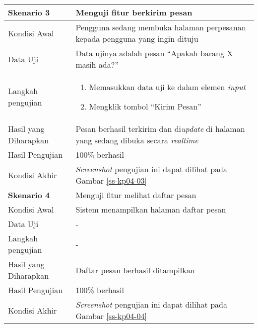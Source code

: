 \begin{longtable}{|X|X|}
		
	\textbf{Skenario 3}
		& Menguji fitur berkirim pesan \\ \hline
	Kondisi Awal
		& Pengguna sedang membuka halaman perpesanan kepada pengguna yang ingin dituju\\ \hline
	Data Uji
		& Data ujinya adalah pesan ``Apakah barang X masih ada?'' \\ \hline
	Langkah pengujian
		& \begin{enumerate}
		\item Memasukkan data uji ke dalam elemen \textit{input} 
		\item Mengklik tombol ``Kirim Pesan''
	\end{enumerate} \\ \hline
	Hasil yang Diharapkan
		& Pesan berhasil terkirim dan di\textit{update} di halaman yang sedang dibuka secara \textit{realtime} \\ \hline
	Hasil Pengujian
		& 100\% berhasil \\ \hline	
	Kondisi Akhir
		& \textit{Screenshot} pengujian ini dapat dilihat pada Gambar \ref{ss-kp04-03}  \\ \hline	
		
	\textbf{Skenario 4}
		& Menguji fitur melihat daftar pesan \\ \hline
	Kondisi Awal
		& Sistem menampilkan halaman daftar pesan\\ \hline
	Data Uji
		& -\\ \hline
	Langkah pengujian
		& - \\ \hline
	Hasil yang Diharapkan
		& Daftar pesan berhasil ditampilkan \\ \hline
	Hasil Pengujian
		& 100\% berhasil \\ \hline	
	Kondisi Akhir
		& \textit{Screenshot} pengujian ini dapat dilihat pada Gambar \ref{ss-kp04-04}  \\ \hline	
		
\end{longtable}